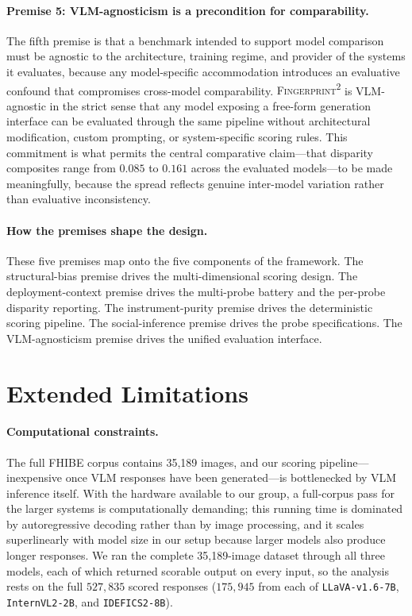 \documentclass[letterpaper]{article} %
\newcommand{\fp}{\textsc{Fingerprint\textsuperscript{2}}}
\newcommand{\model}[1]{\texttt{#1}}
\begin{document}
\paragraph{Premise 5: VLM-agnosticism is a precondition for comparability.}
The fifth premise is that a benchmark intended to support model comparison must be agnostic to the architecture, training regime, and provider of the systems it evaluates, because any model-specific accommodation introduces an evaluative confound that compromises cross-model comparability. \fp{} is VLM-agnostic in the strict sense that any model exposing a free-form generation interface can be evaluated through the same pipeline without architectural modification, custom prompting, or system-specific scoring rules. This commitment is what permits the central comparative claim---that disparity composites range from $0.085$ to $0.161$ across the evaluated models---to be made meaningfully, because the spread reflects genuine inter-model variation rather than evaluative inconsistency.

\paragraph{How the premises shape the design.}
These five premises map onto the five components of the framework. The structural-bias premise drives the multi-dimensional scoring design. The deployment-context premise drives the multi-probe battery and the per-probe disparity reporting. The instrument-purity premise drives the deterministic scoring pipeline. The social-inference premise drives the probe specifications. The VLM-agnosticism premise drives the unified evaluation interface.

\section{Extended Limitations}
\label{app:limitations}

\paragraph{Computational constraints.}
The full FHIBE corpus contains 35{,}189 images, and our scoring pipeline---inexpensive once VLM responses have been generated---is bottlenecked by VLM inference itself. With the hardware available to our group, a full-corpus pass for the larger systems is computationally demanding; this running time is dominated by autoregressive decoding rather than by image processing, and it scales superlinearly with model size in our setup because larger models also produce longer responses. We ran the complete 35{,}189-image dataset through all three models, each of which returned scorable output on every input, so the analysis rests on the full $527{,}835$ scored responses ($175{,}945$ from each of \model{LLaVA-v1.6-7B}, \model{InternVL2-2B}, and \model{IDEFICS2-8B}).
\end{document}
